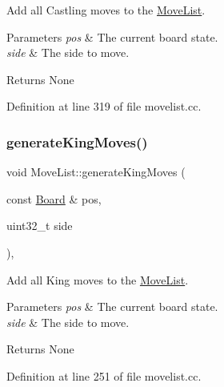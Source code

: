 Add all Castling moves to the \mbox{\hyperlink{classMoveList}{Move\+List}}. 


\begin{DoxyParams}{Parameters}
{\em pos} & The current board state. \\
\hline
{\em side} & The side to move. \\
\hline
\end{DoxyParams}
\begin{DoxyReturn}{Returns}
None 
\end{DoxyReturn}


Definition at line 319 of file movelist.\+cc.

\mbox{\label{classMoveList_a01f21c1bed30c674219746d10c0a7aa7}} 
\subsubsection{\texorpdfstring{generate\+King\+Moves()}{generateKingMoves()}}
{\footnotesize\ttfamily void Move\+List\+::generate\+King\+Moves (\begin{DoxyParamCaption}\item[{const \mbox{\hyperlink{classBoard}{Board}} \&}]{pos,  }\item[{uint32\+\_\+t}]{side }\end{DoxyParamCaption})\hspace{0.3cm}{\ttfamily [private]}, {\ttfamily [noexcept]}}



Add all King moves to the \mbox{\hyperlink{classMoveList}{Move\+List}}. 


\begin{DoxyParams}{Parameters}
{\em pos} & The current board state. \\
\hline
{\em side} & The side to move. \\
\hline
\end{DoxyParams}
\begin{DoxyReturn}{Returns}
None 
\end{DoxyReturn}


Definition at line 251 of file movelist.\+cc.

\mbox{\label{classMoveList_aec2684c095f75d4215908b140d604635}} 

